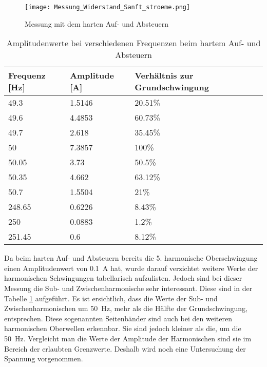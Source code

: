 \begin{figure}[ht!]
	\centering
	\texttt{[image: Messung\_Widerstand\_Sanft\_stroeme.png]}	
	\caption{Messung mit dem harten Auf- und Absteuern}\label{fig:Mess_Widerstand_Sanft_stroeme}
\end{figure}


\begin{table}[ht!]
	\centering
	\begin{tabular}{|l|l|l|}
		\hline
		Frequenz {[}Hz{]} & Amplitude {[}A{]} & Verhältnis zur Grundschwingung	\\ \hline
		49.3              & 1.5146            & 20.51\%							\\ \hline
		49.6              & 4.4853            & 60.73\%							\\ \hline
		49.7              & 2.618             & 35.45\%							\\ \hline
		50                & 7.3857            & 100\%							\\ \hline
		50.05             & 3.73              & 50.5\%							\\ \hline
		50.35             & 4.662             & 63.12\%							\\ \hline
		50.7              & 1.5504            & 21\%							\\ \hline
		248.65            & 0.6226            & 8.43\%							\\ \hline
		250               & 0.0883            & 1.2\%							\\ \hline
		251.45            & 0.6               & 8.12\%							\\ \hline
	\end{tabular}
	\caption{Amplitudenwerte bei verschiedenen Frequenzen beim hartem Auf- und Absteuern}\label{tab:Sanft_stroeme}
\end{table}
Da beim harten Auf- und Absteuern bereits die 5. harmonische Oberschwingung einen Amplitudenwert von  \SI{0.1}{A} hat, wurde darauf verzichtet weitere Werte der harmonischen Schwingungen tabellarisch aufzulisten. Jedoch sind bei dieser Messung die Sub- und Zwischenharmonische sehr interessant. Diese sind in der Tabelle \ref{tab:Sanft_stroeme} aufgeführt. Es ist ersichtlich, dass die Werte der Sub- und Zwischenharmonischen um \SI{50}{Hz}, mehr als die Hälfte der Grundschwingung, entsprechen. Diese sogenannten Seitenbänder sind auch bei den weiteren harmonischen Oberwellen erkennbar. Sie sind jedoch kleiner als die, um die \SI{50}{Hz}. Vergleicht man die Werte der Amplitude der Harmonischen sind sie im Bereich der erlaubten Grenzwerte. Deshalb wird noch eine Untersuchung der Spannung vorgenommen.


